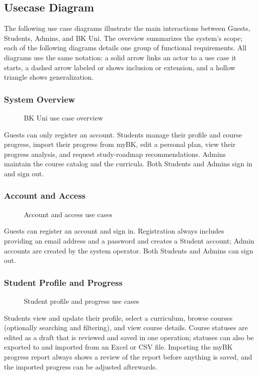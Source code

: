 \subsection{Usecase Diagram}

The following use case diagrams illustrate the main interactions between Guests, Students, Admins, and BK Uni. The overview summarizes the system's scope; each of the following diagrams details one group of functional requirements. All diagrams use the same notation: a solid arrow links an actor to a use case it starts, a dashed arrow labeled \incl{} or \extd{} shows inclusion or extension, and a hollow triangle shows generalization.

\subsubsection{System Overview}
\begin{figure}[H]
    \centering
    
    \caption{BK Uni use case overview}
\end{figure}
Guests can only register an account. Students manage their profile and course progress, import their progress from myBK, edit a personal plan, view their progress analysis, and request study-roadmap recommendations. Admins maintain the course catalog and the curricula. Both Students and Admins sign in and sign out.

\subsubsection{Account and Access}
\begin{figure}[H]
    \centering
    
    \caption{Account and access use cases}
\end{figure}
Guests can register an account and sign in. Registration always includes providing an email address and a password and creates a Student account; Admin accounts are created by the system operator. Both Students and Admins can sign out.

\subsubsection{Student Profile and Progress}
\begin{figure}[H]
    \centering
    
    \caption{Student profile and progress use cases}
\end{figure}
Students view and update their profile, select a curriculum, browse courses (optionally searching and filtering), and view course details. Course statuses are edited as a draft that is reviewed and saved in one operation; statuses can also be exported to and imported from an Excel or CSV file. Importing the myBK progress report always shows a review of the report before anything is saved, and the imported progress can be adjusted afterwards.

